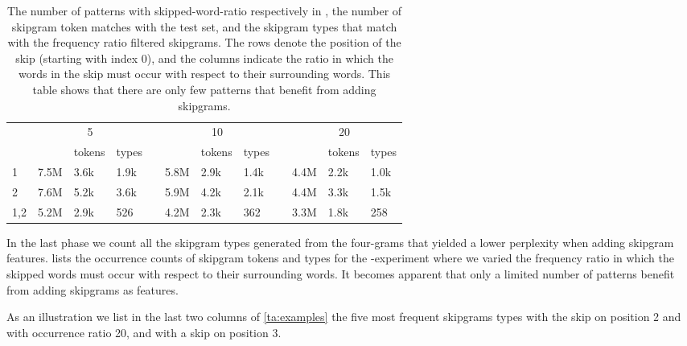 \begin{table*}
	\begin{center}
		\begin{tabular}{l*{3}{l}l*{3}{l}l*{3}{l}}
			& \multicolumn{3}{c}{5} & & \multicolumn{3}{c}{10} & & \multicolumn{3}{c}{20} \\
			& \obw & tokens & types & & \obw & tokens & types & & \obw & tokens & types \\
			\cline{2-4}\cline{6-8}\cline{10-12}
			1 & 7.5M & 3.6k & 1.9k & & 5.8M & 2.9k & 1.4k & & 4.4M & 2.2k & 1.0k \\
			2 & 7.6M & 5.2k & 3.6k & & 5.9M & 4.2k & 2.1k & & 4.4M & 3.3k & 1.5k \\
			1,2 & 5.2M & 2.9k & 526 & & 4.2M & 2.3k & 362 & & 3.3M & 1.8k & 258 \\
		\end{tabular}
		\caption{The number of patterns with skipped-word-ratio respectively in \obw, the number of skipgram token matches with the \emea test set, and the skipgram types that match with the frequency ratio filtered skipgrams. The rows denote the position of the skip (starting with index $0$), and the columns indicate the ratio in which the words in the skip must occur with respect to their surrounding words. This table shows that there are only few patterns that benefit from adding skipgrams.}\label{ta:skipratio}
	\end{center}
\end{table*}

In the last phase we count all the skipgram types generated from the four-grams that yielded a lower perplexity when adding skipgram features.  lists the occurrence counts of skipgram tokens and types for the \obw-\emea experiment where we varied the frequency ratio in which the skipped words must occur with respect to their surrounding words. It becomes apparent that only a limited number of patterns benefit from adding skipgrams as features.

As an illustration we list in the last two columns of \cref{ta:examples} the five most frequent skipgrams types with the skip on position 2 and with occurrence ratio 20, and with a skip on position 3.


